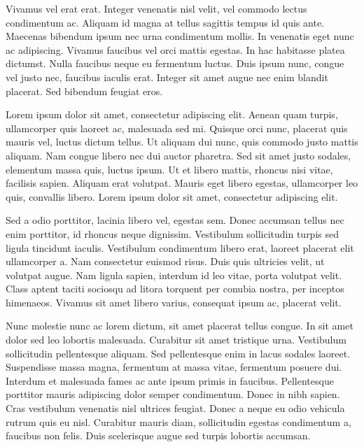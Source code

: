 \documentclass[doutorado,rascunho]{fei}
\begin{document}
\begin{agradecimentos}
Vivamus vel erat erat. Integer venenatis nisl velit, vel commodo lectus condimentum ac. Aliquam id magna at tellus sagittis tempus id quis ante. Maecenas bibendum ipsum nec urna condimentum mollis. In venenatis eget nunc ac adipiscing. Vivamus faucibus vel orci mattis egestas. In hac habitasse platea dictumst. Nulla faucibus neque eu fermentum luctus. Duis ipsum nunc, congue vel justo nec, faucibus iaculis erat. Integer sit amet augue nec enim blandit placerat. Sed bibendum feugiat eros.
\end{agradecimentos}

\begin{resumo}
Lorem ipsum dolor sit amet, consectetur adipiscing elit. Aenean quam turpis, ullamcorper quis laoreet ac, malesuada sed mi. Quisque orci nunc, placerat quis mauris vel, luctus dictum tellus. Ut aliquam dui nunc, quis commodo justo mattis aliquam. Nam congue libero nec dui auctor pharetra. Sed sit amet justo sodales, elementum massa quis, luctus ipsum. Ut et libero mattis, rhoncus nisi vitae, facilisis sapien. Aliquam erat volutpat. Mauris eget libero egestas, ullamcorper leo quis, convallis libero. Lorem ipsum dolor sit amet, consectetur adipiscing elit.

Sed a odio porttitor, lacinia libero vel, egestas sem. Donec accumsan tellus nec enim porttitor, id rhoncus neque dignissim. Vestibulum sollicitudin turpis sed ligula tincidunt iaculis. Vestibulum condimentum libero erat, laoreet placerat elit ullamcorper a. Nam consectetur euismod risus. Duis quis ultricies velit, ut volutpat augue. Nam ligula sapien, interdum id leo vitae, porta volutpat velit. Class aptent taciti sociosqu ad litora torquent per conubia nostra, per inceptos himenaeos. Vivamus sit amet libero varius, consequat ipsum ac, placerat velit.

Nunc molestie nunc ac lorem dictum, sit amet placerat tellus congue. In sit amet dolor sed leo lobortis malesuada. Curabitur sit amet tristique urna. Vestibulum sollicitudin pellentesque aliquam. Sed pellentesque enim in lacus sodales laoreet. Suspendisse massa magna, fermentum at massa vitae, fermentum posuere dui. Interdum et malesuada fames ac ante ipsum primis in faucibus. Pellentesque porttitor mauris adipiscing dolor semper condimentum. Donec in nibh sapien. Cras vestibulum venenatis nisl ultrices feugiat. Donec a neque eu odio vehicula rutrum quis eu nisl. Curabitur mauris diam, sollicitudin egestas condimentum a, faucibus non felis. Duis scelerisque augue sed turpis lobortis accumsan.


\end{resumo}
\end{document}
